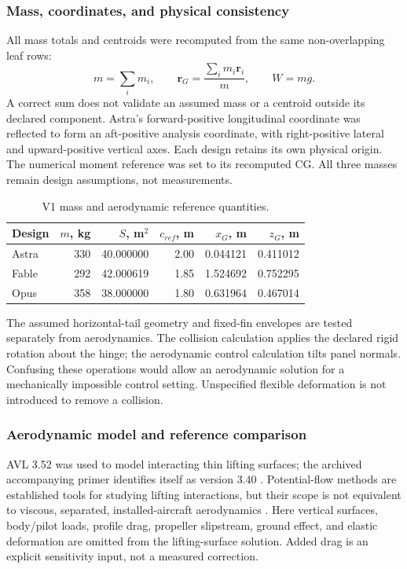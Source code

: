 \documentclass[10pt,letterpaper]{article}
\begin{document}
\subsubsection{Mass, coordinates, and physical consistency}
All mass totals and centroids were recomputed from the same non-overlapping leaf rows:
\begin{equation}
m=\sum_i m_i,\qquad \boldsymbol r_G=\frac{\sum_i m_i\boldsymbol r_i}{m},\qquad W=mg.
\label{eq:mass}
\end{equation}
A correct sum does not validate an assumed mass or a centroid outside its declared component. Astra's forward-positive longitudinal coordinate was reflected to form an aft-positive analysis coordinate, with right-positive lateral and upward-positive vertical axes. Each design retains its own physical origin. The numerical moment reference was set to its recomputed CG. All three masses remain design assumptions, not measurements.

\begin{table}[H]\centering\small
\caption{V1 mass and aerodynamic reference quantities.}\label{tab:refs}
\begin{tabular}{lrrrrr}\toprule
Design & $m$, kg & $S$, m$^2$ & $c_{ref}$, m & $x_G$, m & $z_G$, m\\\midrule
Astra &330&40.000000&2.00&0.044121&0.411012\\
Fable &292&42.000619&1.85&1.524692&0.752295\\
Opus &358&38.000000&1.80&0.631964&0.467014\\\bottomrule
\end{tabular}
\end{table}

The assumed horizontal-tail geometry and fixed-fin envelopes are tested separately from aerodynamics. The collision calculation applies the declared rigid rotation about the hinge; the aerodynamic control calculation tilts panel normals. Confusing these operations would allow an aerodynamic solution for a mechanically impossible control setting. Unspecified flexible deformation is not introduced to remove a collision.

\subsubsection{Aerodynamic model and reference comparison}
AVL 3.52 was used to model interacting thin lifting surfaces; the archived accompanying primer identifies itself as version 3.40 \cite{ref20}. Potential-flow methods are established tools for studying lifting interactions, but their scope is not equivalent to viscous, separated, installed-aircraft aerodynamics \cite{ref21,ref22}. Here vertical surfaces, body/pilot loads, profile drag, propeller slipstream, ground effect, and elastic deformation are omitted from the lifting-surface solution. Added drag is an explicit sensitivity input, not a measured correction.
\end{document}
